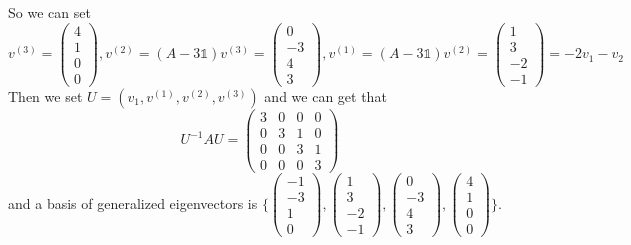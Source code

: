 \documentclass[a4paper,12pt,titlepage]{article}
\begin{document}
So we can set
$$v^{(3)}=\left(\begin{array}{c}
4\\
1\\
0\\
0
\end{array}\right),v^{(2)}=(A-3\mathds{1})v^{(3)}=\left(\begin{array}{c}
0\\
-3\\
4\\
3
\end{array}\right),v^{(1)}=(A-3\mathds{1})v^{(2)}=\left(\begin{array}{c}
1\\
3\\
-2\\
-1
\end{array}\right)=-2v_1-v_2$$
Then we set $U=(v_1,v^{(1)},v^{(2)},v^{(3)})$ and we can get that
$$U^{-1}AU=\left(\begin{array}{cccc}
3&0&0&0\\
0&3&1&0\\
0&0&3&1\\
0&0&0&3
\end{array}\right)$$
and a basis of generalized eigenvectors is $\lbrace\left(\begin{array}{c}
-1\\
-3\\
1\\
0
\end{array}\right),\left(\begin{array}{c}
1\\
3\\
-2\\
-1
\end{array}\right),\left(\begin{array}{c}
0\\
-3\\
4\\
3
\end{array}\right),\left(\begin{array}{c}
4\\
1\\
0\\
0
\end{array}\right)\rbrace$. 
\end{document}
